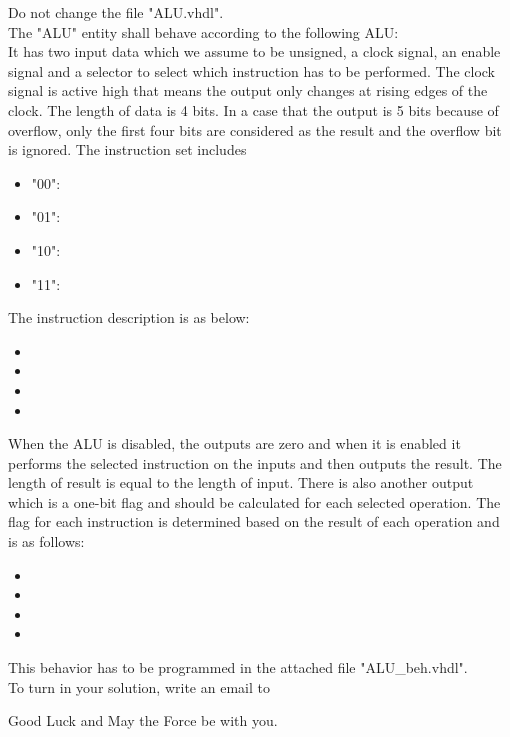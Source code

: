 \documentclass[a4paper,12pt]{article}
\begin{document}
Do not change the file "ALU.vhdl".
\\

The "ALU" entity shall behave according to the following ALU:
\\
It has two input data which we assume to be unsigned, a clock signal, an enable signal and a selector to select which instruction has to be performed. The clock signal is active high that means the output only changes at rising edges of the clock. The length of data is 4 bits. In a case that the output is 5 bits because of overflow, only the first four bits are considered as the result and the overflow bit is ignored. The instruction set includes %
\\
\begin{itemize}
\item "00": %
\item "01": %
\item "10": %
\item "11": %
\end{itemize}
\vspace{0.3cm}

The instruction description is as below:
\begin{itemize}
\item %
\item %
\item %
\item %
\end{itemize}
\vspace{0.3cm}

When the ALU is disabled, the outputs are zero and when it is enabled it performs the selected instruction on the inputs and then outputs the result. The length of result is equal to the length of input. There is also another output which is a one-bit flag and should be calculated for each selected operation. The flag for each instruction is determined based on the result of each operation and is as follows:
\begin{itemize}
\item %
\item %
\item %
\item %
\end{itemize}
\vspace{0.3cm}

This behavior has to be programmed in the attached file "ALU\_beh.vhdl". 
\\

To turn in your solution, write an email to %

\vspace{0.7cm}

Good Luck and May the Force be with you.
\end{document}
